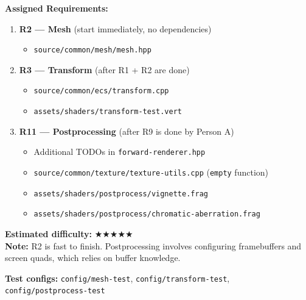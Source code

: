 \documentclass[12pt,a4paper]{article}
\begin{document}
\vspace{0.3cm}

\begin{tcolorbox}[
  colback=personB!8, colframe=personB, title={\textbf{Person B} --- Mesh + Transform + Postprocessing},
  fonttitle=\bfseries\color{white}, coltitle=white
]
\textbf{Assigned Requirements:}
\begin{enumerate}[nosep]
  \item \textbf{R2 --- Mesh} (start immediately, no dependencies)
    \begin{itemize}[nosep]
      \item \texttt{source/common/mesh/mesh.hpp}
    \end{itemize}
  \item \textbf{R3 --- Transform} (after R1 + R2 are done)
    \begin{itemize}[nosep]
      \item \texttt{source/common/ecs/transform.cpp}
      \item \texttt{assets/shaders/transform-test.vert}
    \end{itemize}
  \item \textbf{R11 --- Postprocessing} (after R9 is done by Person A)
    \begin{itemize}[nosep]
      \item Additional TODOs in \texttt{forward-renderer.hpp}
      \item \texttt{source/common/texture/texture-utils.cpp} (\texttt{empty} function)
      \item \texttt{assets/shaders/postprocess/vignette.frag}
      \item \texttt{assets/shaders/postprocess/chromatic-aberration.frag}
    \end{itemize}
\end{enumerate}

\textbf{Estimated difficulty:} {\Large$\bigstar\bigstar\bigstar\bigstar$}$\bigstar$ \\
\textbf{Note:} R2 is fast to finish. Postprocessing involves configuring framebuffers and screen quads, which relies on buffer knowledge.

\textbf{Test configs:} \texttt{config/mesh-test}, \texttt{config/transform-test}, \texttt{config/postprocess-test}
\end{tcolorbox}

\vspace{0.3cm}
\end{document}
